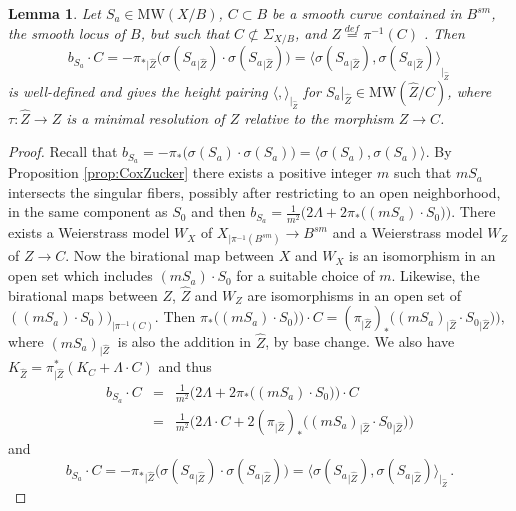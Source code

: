 \documentclass[10pt,a4paper]{amsart}
\newtheorem{lemma}{Lemma}
\newcommand{\MW}{\mathrm{MW}}
\begin{document}
\begin{lemma}\label{lemma:bsaZ}
Let $S_a \in \MW(X/B)$, $ C \subset B $  be a smooth curve contained in $B^{sm}$, the smooth locus of $B$, but such that $ C \not \subset\Sigma_{X/B}$,  and $ Z \stackrel{def}= \pi^{-1}(C)$  . %
Then
\[
 b_{S_a} \cdot C= -{\pi_\ast}_{|\widehat Z}\bigl(\sigma ({S_a}_{|\widehat Z}) \cdot  \sigma({S_a}_{|\widehat Z}) \bigr) = {\langle \sigma ({S_a}_{|\widehat Z}) , \sigma({S_a}_{|\widehat Z})\rangle}_{|_{\widehat Z}}\,
\]
is  well-defined and gives the height pairing $\langle,\rangle_{|_{\widehat Z}}$ for $S_a|_{\widehat Z}\in \MW({\widehat Z}/C)$, where  $ \tau: \widehat Z \to Z$ is a minimal resolution  of $Z$ relative to the morphism $Z \to C$.
\end{lemma}

\begin{proof} 
Recall that $ b_{S_a}
   = -\pi_*   \bigl( \sigma(S_a) \cdot  \sigma(S_a)  \bigr) = \langle  \sigma(S_a),  \sigma(S_a) \rangle.$
  By Proposition \ref{prop:CoxZucker} there exists a positive integer $m$ such that 
$mS_a$ intersects the singular fibers, possibly after restricting to an open neighborhood,  in the same component as $S_0$ and then $ b_{S_a}
    = \frac{1}{m^2}\Big(2 \Lambda + 2\pi_*\bigl((mS_a)\cdot S_0\bigr)\Big)
  $. There exists a Weierstrass model $W_X$ of $X_{|\pi^{-1}(B^{sm})} \to B^{sm}$ and   a Weierstrass model $W_Z$ of $Z\to C$. Now the birational map between $X$ and $W_X$ is an isomorphism in an open set which includes $(mS_a)\cdot S_0$ for a suitable choice of $m$. Likewise, the birational maps between $Z$, $\widehat Z$ and $W_Z$ are isomorphisms in an open set of $((mS_a)\cdot S_0))_{|\pi^{-1}(C)}$. Then 
$\pi_*\bigl((mS_a)\cdot S_0\bigr)\bigr)\cdot C=(\pi_{|\widehat Z})_*\bigl((mS_a)_{|\widehat Z}\cdot {S_0}_{|\widehat Z}\bigr)\Big),$  where  $(mS_a)_{|\widehat Z} \ $ is also the addition in $\widehat Z$, {by base change}. We also have  $K_{\widehat Z}= \pi_{|\widehat Z}^*(K_C+ \Lambda \cdot C)$ and thus
\begin{eqnarray} b_{S_a} \cdot C
   & =& \frac{1}{m^2}\Big(2 \Lambda + 2\pi_*\bigl((mS_a)\cdot S_0\bigr)\Big)\cdot C \nonumber \\
   &=& \frac{1}{m^2}\Big(2 \Lambda \cdot C + 2(\pi_{|\widehat Z})_*\bigl((mS_a)_{|\widehat Z}\cdot {S_0}_{|\widehat Z}\bigr)\Big) \nonumber
\end{eqnarray}
and 
 \[ b_{S_a} \cdot C = -{\pi_\ast}_{|\widehat Z}\bigl(\sigma ({S_a}_{|\widehat Z}) \cdot  \sigma({S_a}_{|\widehat Z}) \bigr) = \langle \sigma ({S_a}_{|\widehat Z}) , \sigma({S_a}_{|\widehat Z})\rangle_{|_{\widehat Z}} \,.
 \]\end{proof}
\end{document}
